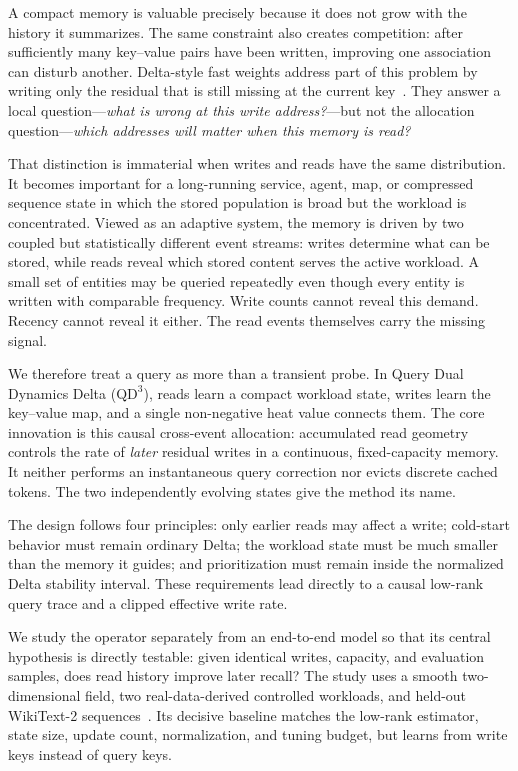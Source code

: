 \documentclass[pdflatex,sn-mathphys-num]{sn-jnl}
\theoremstyle{thmstyleone}
\newcommand{\QDDD}{\ensuremath{\mathrm{QD}^{3}}}
\begin{document}
A compact memory is valuable precisely because it does not grow with the history it summarizes. The same constraint also creates competition: after sufficiently many key--value pairs have been written, improving one association can disturb another. Delta-style fast weights address part of this problem by writing only the residual that is still missing at the current key~\cite{widrow1960,schlag2021}. They answer a local question---\emph{what is wrong at this write address?}---but not the allocation question---\emph{which addresses will matter when this memory is read?}

That distinction is immaterial when writes and reads have the same distribution. It becomes important for a long-running service, agent, map, or compressed sequence state in which the stored population is broad but the workload is concentrated. Viewed as an adaptive system, the memory is driven by two coupled but statistically different event streams: writes determine what can be stored, while reads reveal which stored content serves the active workload. A small set of entities may be queried repeatedly even though every entity is written with comparable frequency. Write counts cannot reveal this demand. Recency cannot reveal it either. The read events themselves carry the missing signal.

We therefore treat a query as more than a transient probe. In Query Dual Dynamics Delta (\QDDD), reads learn a compact workload state, writes learn the key--value map, and a single non-negative heat value connects them. The core innovation is this causal cross-event allocation: accumulated read geometry controls the rate of \emph{later} residual writes in a continuous, fixed-capacity memory. It neither performs an instantaneous query correction nor evicts discrete cached tokens. The two independently evolving states give the method its name.

The design follows four principles: only earlier reads may affect a write; cold-start behavior must remain ordinary Delta; the workload state must be much smaller than the memory it guides; and prioritization must remain inside the normalized Delta stability interval. These requirements lead directly to a causal low-rank query trace and a clipped effective write rate.

We study the operator separately from an end-to-end model so that its central hypothesis is directly testable: given identical writes, capacity, and evaluation samples, does read history improve later recall? The study uses a smooth two-dimensional field, two real-data-derived controlled workloads, and held-out WikiText-2 sequences~\cite{merity2016wikitext}. Its decisive baseline matches the low-rank estimator, state size, update count, normalization, and tuning budget, but learns from write keys instead of query keys.
\end{document}
